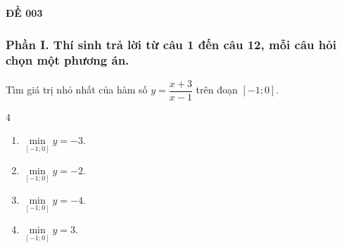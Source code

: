 \begin{center}
	\textbf{{\Huge ĐỀ 003}}
\end{center}
\subsubsection*{Phần I. Thí sinh trả lời từ câu 1 đến câu 12, mỗi câu hỏi chọn một phương án.}
\setcounter{bt}{0}
\begin{baitap}
	Tìm giá trị nhỏ nhất của hàm số $y = \dfrac{x + 3}{x - 1}$ trên đoạn $[-1;0]$.
	\begin{multicols}{4}
		\begin{enumerate}[\quad \bf A.]
			\item $\min\limits_{[-1;0]} y = -3$.
			\item $\min\limits_{[-1;0]} y = -2$.
			\item $\min\limits_{[-1;0]} y = -4$.
			\item $\min\limits_{[-1;0]} y = 3$.
		\end{enumerate}
	\end{multicols}
\end{baitap}


